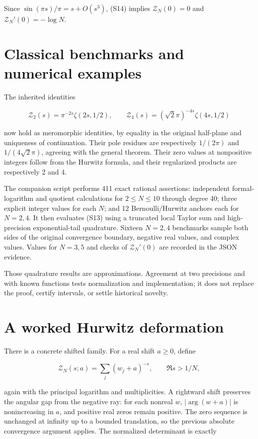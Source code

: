 Since \(\sin(\pi s)/\pi=s+O(s^3)\), (S14) implies \(\mathcal Z_N(0)=0\)
and \(\mathcal Z_N'(0)=-\log N\).

\hypertarget{classical-benchmarks-and-numerical-examples}{%
\section{Classical benchmarks and numerical
examples}\label{classical-benchmarks-and-numerical-examples}}

The inherited identities

\[
\mathcal Z_2(s)=\pi^{-2s}\zeta(2s,1/2),\qquad
\mathcal Z_4(s)=(\sqrt2\pi)^{-4s}\zeta(4s,1/2)
\]

now hold as meromorphic identities, by equality in the original
half-plane and uniqueness of continuation. Their pole residues are
respectively \(1/(2\pi)\) and \(1/(4\sqrt2\pi)\), agreeing with the
general theorem. Their zero values at nonpositive integers follow from
the Hurwitz formula, and their regularized products are respectively 2
and 4.

The companion script performs 411 exact rational assertions: independent
formal-logarithm and quotient calculations for \(2\le N\le10\) through
degree 40; three explicit integer values for each \(N\); and 12
Bernoulli/Hurwitz anchors each for \(N=2,4\). It then evaluates (S13)
using a truncated local Taylor sum and high-precision exponential-tail
quadrature. Sixteen \(N=2,4\) benchmarks sample both sides of the
original convergence boundary, negative real values, and complex values.
Values for \(N=3,5\) and checks of \(\mathcal Z_N'(0)\) are recorded in
the JSON evidence.

Those quadrature results are approximations. Agreement at two precisions
and with known functions tests normalization and implementation; it does
not replace the proof, certify intervals, or settle historical novelty.

\hypertarget{a-worked-hurwitz-deformation}{%
\section{A worked Hurwitz
deformation}\label{a-worked-hurwitz-deformation}}

There is a concrete shifted family. For a real shift \(a\ge0\), define

\[
\mathcal Z_N(s;a)=\sum_j(w_j+a)^{-s},\qquad \Re s>1/N,
\tag{T1}
\]

again with the principal logarithm and multiplicities. A rightward shift
preserves the angular gap from the negative ray: for each nonreal \(w\),
\(|\arg(w+a)|\) is nonincreasing in \(a\), and positive real zeros
remain positive. The zero sequence is unchanged at infinity up to a
bounded translation, so the previous absolute convergence argument
applies. The normalized determinant is exactly

